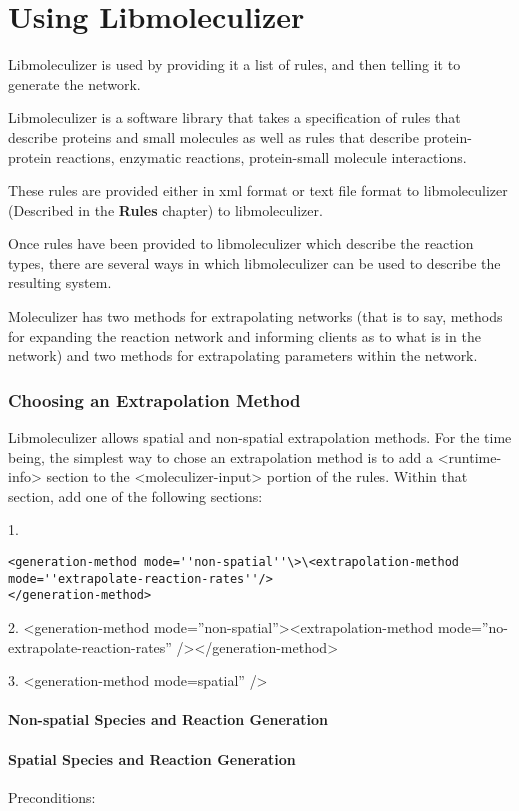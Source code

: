 \chapter{Using Libmoleculizer}
\label{chap:usingLibmoleculizerChapter}

Libmoleculizer is used by providing it a list of rules, and then
telling it to generate the network.  


Libmoleculizer is a software library that takes a specification of
rules that describe proteins and small molecules as well as rules that
describe protein-protein reactions, enzymatic reactions, protein-small
molecule interactions.  

These rules are provided either in xml format or text file format to
libmoleculizer (Described in the {\bf Rules} chapter) to
libmoleculizer. 

Once rules have been provided to libmoleculizer which describe the
reaction types, there are several ways in which libmoleculizer can be
used to describe the resulting system.  

Moleculizer has two methods for extrapolating networks (that is to
say, methods for expanding the reaction network and informing clients
as to what is in the network) and two methods for extrapolating
parameters within the network.  

\subsection{Choosing an Extrapolation Method}

Libmoleculizer allows spatial and non-spatial extrapolation methods.
For the time being, the simplest way to chose an extrapolation method
is to add a <runtime-info> section to the <moleculizer-input> portion
of the rules.  Within that section, add one of the following sections: 

1.
\begin{verbatim}
<generation-method mode=''non-spatial''\>\<extrapolation-method
mode=''extrapolate-reaction-rates''/>
</generation-method>
\end{verbatim}


2.
<generation-method mode=''non-spatial''><extrapolation-method
mode=''no-extrapolate-reaction-rates'' /></generation-method>

3.
<generation-method mode=spatial'' />


\subsubsection{Non-spatial Species and Reaction Generation}
\subsubsection{Spatial Species and Reaction Generation}

Preconditions:



